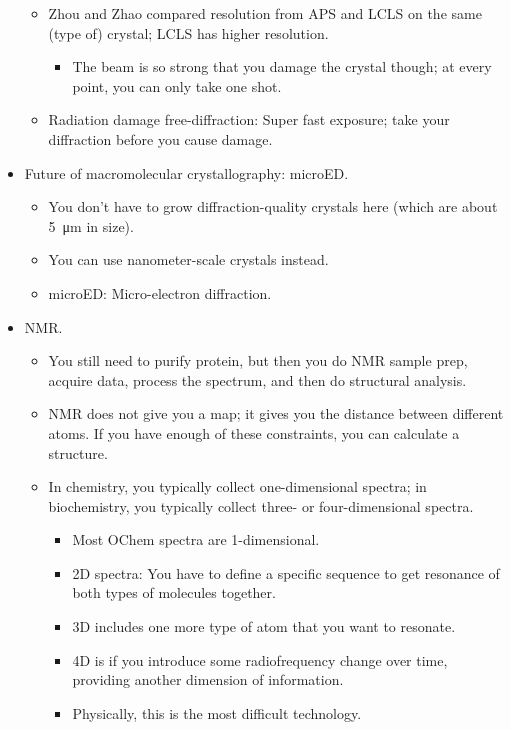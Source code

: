 \documentclass[../notes.tex]{subfiles}
\begin{document}
\begin{itemize}
\begin{itemize}
        \item Zhou and Zhao compared resolution from APS and LCLS on the same (type of) crystal; LCLS has higher resolution.
        \begin{itemize}
            \item The beam is so strong that you damage the crystal though; at every point, you can only take one shot.
        \end{itemize}
        \item Radiation damage free-diffraction: Super fast exposure; take your diffraction before you cause damage.
    \end{itemize}
    \item Future of macromolecular crystallography: microED.
    \begin{itemize}
        \item You don't have to grow diffraction-quality crystals here (which are about \SI{5}{\micro\meter} in size).
        \item You can use nanometer-scale crystals instead.
        \item microED: Micro-electron diffraction.
    \end{itemize}
    \item NMR.
    \begin{itemize}
        \item You still need to purify protein, but then you do NMR sample prep, acquire data, process the spectrum, and then do structural analysis.
        \item NMR does not give you a map; it gives you the distance between different atoms. If you have enough of these constraints, you can calculate a structure.
        \item In chemistry, you typically collect one-dimensional spectra; in biochemistry, you typically collect three- or four-dimensional spectra.
        \begin{itemize}
            \item Most OChem spectra are 1-dimensional.
            \item 2D spectra: You have to define a specific sequence to get resonance of both types of molecules together.
            \item 3D includes one more type of atom that you want to resonate.
            \item 4D is if you introduce some radiofrequency change over time, providing another dimension of information.
            \item Physically, this is the most difficult technology.

\end{itemize}
\end{itemize}
\end{itemize}
\end{document}
